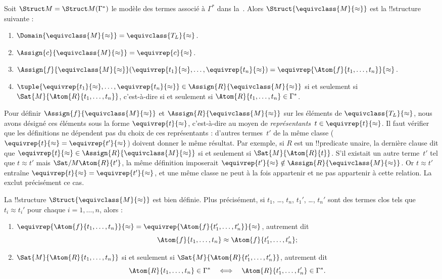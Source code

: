 \documentclass[../../../include/open-logic-section]{subfiles}
\begin{document}
\begin{defn}
Soit $\Struct M=\Struct M(\Gamma^*)$ le modèle des termes associé à
$\Gamma^*$ dans la~. Alors
$\Struct{\equivclass{M}{\approx}}$ est la !!{structure} suivante :
\begin{enumerate}
\item $\Domain{\equivclass{M}{\approx}}=
  \equivclass{T_L}{\approx}$.
\item $\Assign{c}{\equivclass{M}{\approx}}=
  \equivrep{c}{\approx}$.
\item $\Assign{f}{\equivclass{M}{\approx}}
  (\equivrep{t_1}{\approx},\dots,\equivrep{t_n}{\approx})=
  \equivrep{\Atom{f}{t_1,\dots,t_n}}{\approx}$.
\item $\tuple{\equivrep{t_1}{\approx},\dots,\equivrep{t_n}{\approx}}
  \in\Assign{R}{\equivclass{M}{\approx}}$ si et seulement si
  $\Sat{M}{\Atom{R}{t_1,\dots,t_n}}$, c'est-à-dire si et seulement si
  $\Atom{R}{t_1,\dots,t_n}\in\Gamma^*$.
\end{enumerate}
\end{defn}

\begin{explain}
Pour définir $\Assign{f}{\equivclass{M}{\approx}}$ et
$\Assign{R}{\equivclass{M}{\approx}}$ sur les éléments de
$\equivclass{T_L}{\approx}$, nous avons désigné ces éléments sous la
forme $\equivrep{t}{\approx}$, c'est-à-dire au moyen de
\emph{représentants}~$t\in\equivrep{t}{\approx}$. Il faut vérifier
que les définitions ne dépendent pas du choix de ces représentants :
d'autres termes~$t'$ de la même classe
($\equivrep{t}{\approx}=\equivrep{t'}{\approx}$) doivent donner le
même résultat. Par exemple, si $R$ est un !!{predicate} unaire, la
dernière clause dit que
$\equivrep{t}{\approx}\in\Assign{R}{\equivclass{M}{\approx}}$
si et seulement si $\Sat{M}{\Atom{R}{t}}$. S'il existait un autre
terme~$t'$ tel que $t\approx t'$ mais
$\Sat/{M}{\Atom{R}{t'}}$,
la même définition imposerait
$\equivrep{t'}{\approx}\notin
\Assign{R}{\equivclass{M}{\approx}}$.
Or $t\approx t'$ entraîne
$\equivrep{t}{\approx}=\equivrep{t'}{\approx}$, et une même classe
ne peut à la fois appartenir et ne pas appartenir à cette relation.
La  exclut précisément ce cas.
\end{explain}

\begin{prop}
La !!{structure} $\Struct{\equivclass{M}{\approx}}$ est bien définie.
Plus précisément, si $t_1$, \dots, $t_n$, $t_1'$, \dots, $t_n'$ sont
des termes clos tels que $t_i\approx t_i'$ pour chaque $i=1,\dots,n$,
alors :
\begin{enumerate}
\item $\equivrep{\Atom{f}{t_1,\dots,t_n}}{\approx}=
  \equivrep{\Atom{f}{t_1',\dots,t_n'}}{\approx}$, autrement dit
  \[
  \Atom{f}{t_1,\dots,t_n}\approx
  \Atom{f}{t_1',\dots,t_n'};
  \]
\item $\Sat{M}{\Atom{R}{t_1,\dots,t_n}}$ si et seulement si
  $\Sat{M}{\Atom{R}{t_1',\dots,t_n'}}$, autrement dit
  \[
  \Atom{R}{t_1,\dots,t_n}\in\Gamma^*
  \quad\Longleftrightarrow\quad
  \Atom{R}{t_1',\dots,t_n'}\in\Gamma^*.
  \]
\end{enumerate}
\end{prop}
\end{document}
